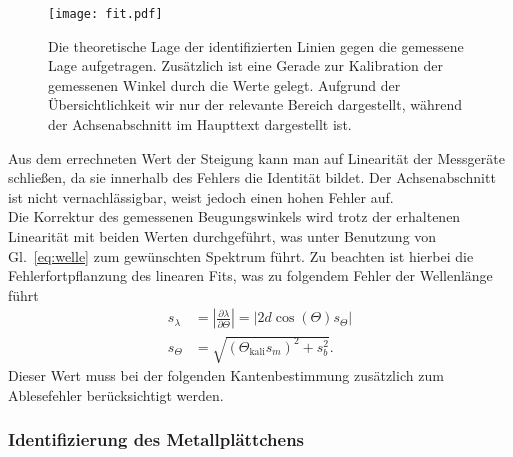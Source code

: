 \begin{figure}[h!]
    \centering
    \texttt{[image: fit.pdf]}
    \caption{\label{fig:fitkali}Die theoretische Lage der identifizierten Linien gegen 
    die gemessene Lage aufgetragen. Zusätzlich ist eine Gerade zur Kalibration der gemessenen 
    Winkel durch die Werte gelegt. Aufgrund der Übersichtlichkeit wir nur der relevante 
    Bereich dargestellt, während der Achsenabschnitt im Haupttext dargestellt ist.}
\end{figure}\FloatBarrier
Aus dem errechneten Wert der Steigung kann man auf Linearität der Messgeräte schließen, da sie innerhalb 
des Fehlers die Identität bildet. Der Achsenabschnitt ist nicht vernachlässigbar, weist jedoch einen
hohen Fehler auf. \\
Die Korrektur des gemessenen Beugungswinkels wird trotz der erhaltenen Linearität 
mit beiden Werten durchgeführt, was unter 
Benutzung von Gl.~\eqref{eq:welle} zum gewünschten Spektrum führt. 
Zu beachten ist hierbei die Fehlerfortpflanzung des linearen Fits, was zu folgendem 
Fehler der Wellenlänge führt
\begin{align}
    s_{\lambda} &= \left\vert\frac{\partial \lambda}{\partial \Theta}\right\vert = \left\vert2d\cos(\Theta)s_{\Theta}\right\vert \\
    s_{\Theta} &= \sqrt{\left(\Theta_{\text{kali}}s_{m}\right)^{2} + s_{b}^{2}}.
\end{align}
Dieser Wert muss bei der folgenden Kantenbestimmung zusätzlich zum Ablesefehler berücksichtigt werden.
\subsubsection{Identifizierung des Metallplättchens}






